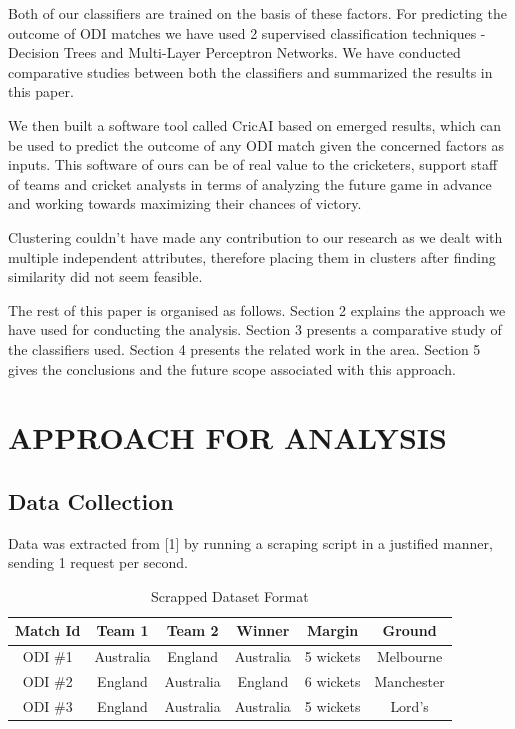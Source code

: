 \documentclass[a4paper, 10pt, conference]{IEEEtran}
\begin{document}
Both of our classifiers are trained on the basis of these factors. For predicting the outcome of ODI matches we have used 2 supervised classification techniques - Decision Trees and Multi-Layer Perceptron Networks. We have conducted comparative studies between both the classifiers and summarized the results in this paper.

We then built a software tool called CricAI based on emerged results, which can be used to predict the outcome of any ODI match given the concerned factors as inputs. This software of ours can be of real value to the cricketers, support staff of teams and cricket analysts in terms of analyzing the future game in advance and working towards maximizing their chances of victory.

Clustering couldn't have made any contribution to our research as we dealt with multiple independent attributes, therefore placing them in clusters after finding similarity did not seem feasible.

The rest of this paper is organised as follows. Section 2 explains the approach we have used for conducting the analysis. Section 3 presents a comparative study of the classifiers used. Section 4 presents the related work in the area. Section 5 gives the conclusions and the future scope associated with this approach.\\

\section{APPROACH FOR ANALYSIS}

\subsection{Data Collection}

Data was extracted from [1] by running a scraping script in a justified manner, sending 1 request per second.
\begin{table}[h!]
  \begin{center}
    \caption{Scrapped Dataset Format}
    \label{tab:table1}
    \begin{tabular}{cccccc} 
      \textbf{Match Id} & \textbf{Team 1} & \textbf{Team 2} & \textbf{Winner} & \textbf{Margin} & \textbf{Ground}\\
      \hline
      ODI \#1 & Australia & England & Australia & 5 wickets & Melbourne\\
      ODI \#2 & England & Australia & England & 6 wickets & Manchester\\
      ODI \#3 & England & Australia & Australia & 5 wickets & Lord's\\
    \end{tabular}
  \end{center}
\end{table}
\end{document}
